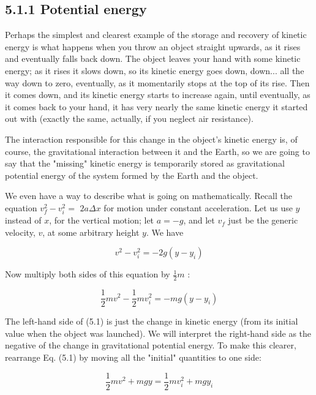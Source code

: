 \documentclass[10pt]{article}
\begin{document}
\subsection*{5.1.1 Potential energy}
Perhaps the simplest and clearest example of the storage and recovery of kinetic energy is what happens when you throw an object straight upwards, as it rises and eventually falls back down. The object leaves your hand with some kinetic energy; as it rises it slows down, so its kinetic energy goes down, down... all the way down to zero, eventually, as it momentarily stops at the top of its rise. Then it comes down, and its kinetic energy starts to increase again, until eventually, as it comes back to your hand, it has very nearly the same kinetic energy it started out with (exactly the same, actually, if you neglect air resistance).

The interaction responsible for this change in the object's kinetic energy is, of course, the gravitational interaction between it and the Earth, so we are going to say that the "missing" kinetic energy is temporarily stored as gravitational potential energy of the system formed by the Earth and the object.

We even have a way to describe what is going on mathematically. Recall the equation $v_{f}^{2}-v_{i}^{2}=$ $2 a \Delta x$ for motion under constant acceleration. Let us use $y$ instead of $x$, for the vertical motion; let $a=-g$, and let $v_{f}$ just be the generic velocity, $v$, at some arbitrary height $y$. We have

$$
v^{2}-v_{i}^{2}=-2 g\left(y-y_{i}\right)
$$

Now multiply both sides of this equation by $\frac{1}{2} m$ :


\begin{equation*}
\frac{1}{2} m v^{2}-\frac{1}{2} m v_{i}^{2}=-m g\left(y-y_{i}\right) \tag{5.1}
\end{equation*}


The left-hand side of (5.1) is just the change in kinetic energy (from its initial value when the object was launched). We will interpret the right-hand side as the negative of the change in gravitational potential energy. To make this clearer, rearrange Eq. (5.1) by moving all the "initial" quantities to one side:


\begin{equation*}
\frac{1}{2} m v^{2}+m g y=\frac{1}{2} m v_{i}^{2}+m g y_{i} \tag{5.2}
\end{equation*}
\end{document}
